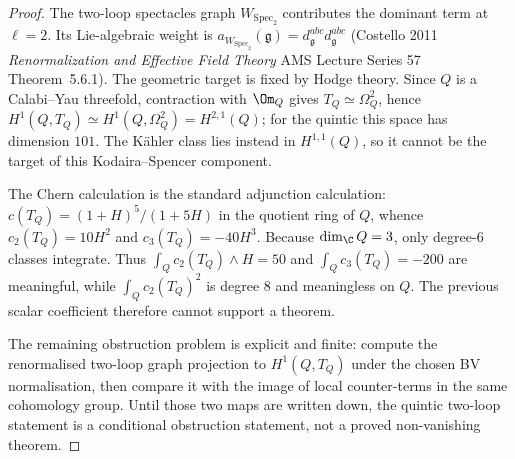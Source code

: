 \begin{proof}
The two-loop spectacles graph $W_{\mathrm{Spec}_2}$ contributes
the dominant term at $\ell = 2$. Its Lie-algebraic weight is
$a_{W_{\mathrm{Spec}_2}}(\mathfrak g) = d^{abc}_{\mathfrak g}
d^{abc}_{\mathfrak g}$ (Costello 2011 \emph{Renormalization and
Effective Field Theory} AMS Lecture Series 57 Theorem~5.6.1). The
geometric target is fixed by Hodge theory. Since $Q$ is a Calabi--Yau
threefold, contraction with $\Om_Q$ gives
$T_Q \simeq \Omega_Q^2$, hence
$H^1(Q,T_Q) \simeq H^1(Q,\Omega_Q^2)=H^{2,1}(Q)$; for the quintic this
space has dimension $101$. The K\"ahler class lies instead in
$H^{1,1}(Q)$, so it cannot be the target of this Kodaira--Spencer
component.

The Chern calculation is the standard adjunction calculation:
$c(T_Q)=(1+H)^5/(1+5H)$ in the quotient ring of $Q$, whence
$c_2(T_Q)=10H^2$ and $c_3(T_Q)=-40H^3$. Because $\dim_{\C}Q=3$,
only degree-$6$ classes integrate. Thus $\int_Q c_2(T_Q)\wedge H=50$
and $\int_Q c_3(T_Q)=-200$ are meaningful, while
$\int_Q c_2(T_Q)^2$ is degree $8$ and meaningless on $Q$. The
previous scalar coefficient therefore cannot support a theorem.

The remaining obstruction problem is explicit and finite: compute the
renormalised two-loop graph projection to $H^1(Q,T_Q)$ under the
chosen BV normalisation, then compare it with the image of local
counter-terms in the same cohomology group. Until those two maps are
written down, the quintic two-loop statement is a conditional
obstruction statement, not a proved non-vanishing theorem.
\end{proof}

